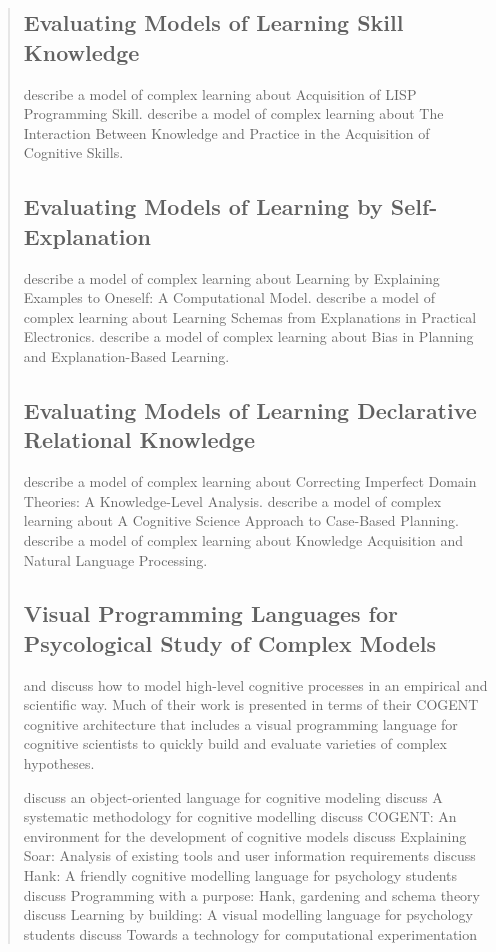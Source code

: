 \begin{quotation}
\subsection{Evaluating Models of Learning Skill Knowledge}
\cite{anderson1993alps} describe a model of complex learning about Acquisition of LISP Programming Skill.
\cite{ohlsson1993ibkpacs} describe a model of complex learning about The Interaction Between Knowledge and Practice in the Acquisition of Cognitive Skills.

\subsection{Evaluating Models of Learning by Self-Explanation}
\cite{vanlehn1993lbeeo} describe a model of complex learning about Learning by Explaining Examples to Oneself: A Computational Model.
\cite{kieras1993lsepe} describe a model of complex learning about Learning Schemas from Explanations in Practical Electronics.
\cite{rosenbloom1993bpebl} describe a model of complex learning about Bias in Planning and Explanation-Based Learning.

\subsection{Evaluating Models of Learning Declarative Relational Knowledge}
\cite{huffman1993cidt} describe a model of complex learning about Correcting Imperfect Domain Theories: A Knowledge-Level Analysis.
\cite{hammond1993csacbp} describe a model of complex learning about A Cognitive Science Approach to Case-Based Planning.
\cite{wilensky1993kanlp} describe a model of complex learning about Knowledge Acquisition and Natural Language Processing.

\subsection{Visual Programming Languages for Psycological Study of Complex Models}

\cite{cooper2002mhl} and \cite{cooper1998cvd} discuss how to model high-level cognitive processes in an empirical and scientific way.
Much of their work is presented in terms of their COGENT cognitive architecture that includes a visual programming language for cognitive scientists to quickly build and evaluate varieties of complex hypotheses.
	      
\cite{cooper1995too} discuss an object-oriented language for cognitive modeling
\cite{cooper1996smc} discuss A systematic methodology for cognitive modelling
\cite{cooper1998ced} discuss COGENT: An environment for the development of cognitive models
\cite{councill2003esa} discuss Explaining Soar: Analysis of existing tools and user information requirements
\cite{mulholland1998hfc} discuss Hank: A friendly cognitive modelling language for psychology students
\cite{mulholland1999pph} discuss Programming with a purpose: Hank, gardening and schema theory
\cite{mulholland2000lbv} discuss Learning by building: A visual modelling language for psychology students
\cite{yule2001ttc} discuss Towards a technology for computational experimentation


\end{quotation}
